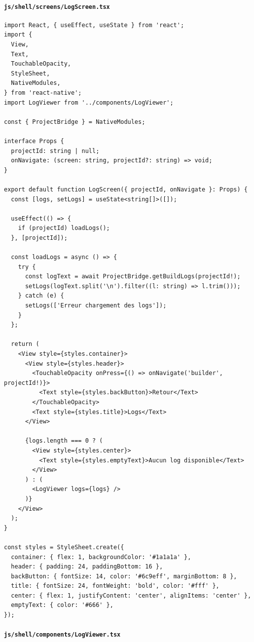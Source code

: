 \documentclass[11pt]{article}
\begin{document}
\paragraph{\texttt{js/shell/screens/LogScreen.tsx}}

\begin{verbatim}
import React, { useEffect, useState } from 'react';
import {
  View,
  Text,
  TouchableOpacity,
  StyleSheet,
  NativeModules,
} from 'react-native';
import LogViewer from '../components/LogViewer';

const { ProjectBridge } = NativeModules;

interface Props {
  projectId: string | null;
  onNavigate: (screen: string, projectId?: string) => void;
}

export default function LogScreen({ projectId, onNavigate }: Props) {
  const [logs, setLogs] = useState<string[]>([]);

  useEffect(() => {
    if (projectId) loadLogs();
  }, [projectId]);

  const loadLogs = async () => {
    try {
      const logText = await ProjectBridge.getBuildLogs(projectId!);
      setLogs(logText.split('\n').filter((l: string) => l.trim()));
    } catch (e) {
      setLogs(['Erreur chargement des logs']);
    }
  };

  return (
    <View style={styles.container}>
      <View style={styles.header}>
        <TouchableOpacity onPress={() => onNavigate('builder', projectId!)}>
          <Text style={styles.backButton}>Retour</Text>
        </TouchableOpacity>
        <Text style={styles.title}>Logs</Text>
      </View>

      {logs.length === 0 ? (
        <View style={styles.center}>
          <Text style={styles.emptyText}>Aucun log disponible</Text>
        </View>
      ) : (
        <LogViewer logs={logs} />
      )}
    </View>
  );
}

const styles = StyleSheet.create({
  container: { flex: 1, backgroundColor: '#1a1a1a' },
  header: { padding: 24, paddingBottom: 16 },
  backButton: { fontSize: 14, color: '#6c9eff', marginBottom: 8 },
  title: { fontSize: 24, fontWeight: 'bold', color: '#fff' },
  center: { flex: 1, justifyContent: 'center', alignItems: 'center' },
  emptyText: { color: '#666' },
});
\end{verbatim}

\paragraph{\texttt{js/shell/components/LogViewer.tsx}}
\end{document}
